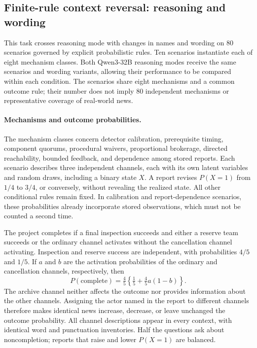 \subsection{Finite-rule context reversal: reasoning and wording}
\label{app:exp1-fresh-factorial}

This task crosses reasoning mode with changes in names and wording on 80
scenarios governed by explicit probabilistic rules. Ten scenarios instantiate
each of eight mechanism classes. Both Qwen3-32B reasoning modes receive the
same scenarios and wording variants, allowing their performance to be compared
within each condition. The scenarios share eight mechanisms and a common
outcome rule; their number does not imply 80 independent mechanisms or
representative coverage of real-world news.

\paragraph{Mechanisms and outcome probabilities.}
The mechanism classes concern detector calibration, prerequisite timing,
component quorums, procedural waivers, proportional brokerage, directed
reachability, bounded feedback, and dependence among stored reports. Each
scenario describes three independent channels, each with its own latent variables and random
draws, including a binary state $X$. A report revises $P(X=1)$ from $1/4$ to
$3/4$, or conversely, without revealing the realized state. All other conditional
rules remain fixed. In calibration and report-dependence scenarios, these
probabilities already incorporate stored observations, which must not be counted
a second time.

The project completes if a final inspection succeeds and either a reserve team
succeeds or the ordinary channel activates without the cancellation channel
activating. Inspection and reserve success are independent, with probabilities
$4/5$ and $1/5$. If $a$ and $b$ are the activation probabilities of the ordinary
and cancellation channels, respectively, then
\[
 P(\mathrm{complete})=\tfrac45\left\{\tfrac15+\tfrac45a(1-b)\right\}.
\]
The archive channel neither affects the outcome nor provides information about
the other channels. Assigning the actor named in the report to different channels
therefore makes identical news increase, decrease, or leave unchanged the outcome
probability. All channel descriptions appear in every context, with identical
word and punctuation inventories. Half the questions ask about noncompletion;
reports that raise and lower $P(X=1)$ are balanced.

